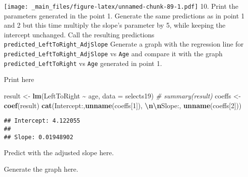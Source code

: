 \documentclass[
]{book}
\newenvironment{Shaded}{\begin{snugshade}}{\end{snugshade}}
\newcommand{\AttributeTok}[1]{\textcolor[rgb]{0.13,0.29,0.53}{#1}}
\newcommand{\CommentTok}[1]{\textcolor[rgb]{0.56,0.35,0.01}{\textit{#1}}}
\newcommand{\DecValTok}[1]{\textcolor[rgb]{0.00,0.00,0.81}{#1}}
\newcommand{\FunctionTok}[1]{\textcolor[rgb]{0.13,0.29,0.53}{\textbf{#1}}}
\newcommand{\NormalTok}[1]{#1}
\newcommand{\OtherTok}[1]{\textcolor[rgb]{0.56,0.35,0.01}{#1}}
\newcommand{\SpecialCharTok}[1]{\textcolor[rgb]{0.81,0.36,0.00}{\textbf{#1}}}
\newcommand{\StringTok}[1]{\textcolor[rgb]{0.31,0.60,0.02}{#1}}
\begin{document}
\texttt{[image: \_main\_files/figure-latex/unnamed-chunk-89-1.pdf]}
10. Print the parameters generated in the point 1. Generate the same predictions as in point 1 and 2 but this time multiply the slope's parameter by 5, while keeping the intercept unchanged. Call the resulting predictions \texttt{predicted\_LeftToRight\_AdjSlope} Generate a graph with the regression line for \texttt{predicted\_LeftToRight\_AdjSlope} vs \texttt{Age} and compare it with the graph \texttt{predicted\_LeftToRight} vs \texttt{Age} generated in point 1.

Print here

\begin{Shaded}
\begin{Highlighting}[]
\NormalTok{result }\OtherTok{\textless{}{-}} \FunctionTok{lm}\NormalTok{(LeftToRight }\SpecialCharTok{\textasciitilde{}}\NormalTok{ age, }\AttributeTok{data =}\NormalTok{ selects19)}
\CommentTok{\# summary(result)}
\NormalTok{coeffs }\OtherTok{\textless{}{-}} \FunctionTok{coef}\NormalTok{(result)}
\FunctionTok{cat}\NormalTok{(}\StringTok{\textquotesingle{}Intercept:\textquotesingle{}}\NormalTok{,}\FunctionTok{unname}\NormalTok{(coeffs[}\DecValTok{1}\NormalTok{]), }\StringTok{\textquotesingle{}}\SpecialCharTok{\textbackslash{}n\textbackslash{}n}\StringTok{Slope:\textquotesingle{}}\NormalTok{, }\FunctionTok{unname}\NormalTok{(coeffs[}\DecValTok{2}\NormalTok{]))}
\end{Highlighting}
\end{Shaded}

\begin{verbatim}
## Intercept: 4.122055 
## 
## Slope: 0.01948902
\end{verbatim}

Predict with the adjusted slope here.

\begin{Shaded}
\end{Shaded}

Generate the graph here.
\end{document}
